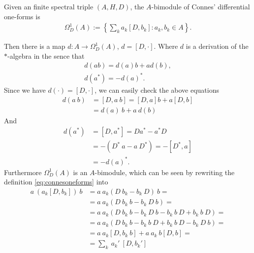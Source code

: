 \begin{definition}
    Given an finite spectral triple $(A, H, D)$, the $A$-bimodule of
    Connes' differential one-forms is
    \begin{align}\label{eq:connesoneforms}
        \Omega _D ^1 (A) := \left\{ \sum _k a_k[D, b_k]: a_k, b_k \in A
        \right\}.
    \end{align}
\end{definition}
Then there is a map $d:A\rightarrow \Omega _D ^1 (A)$, $d = [D, \cdot]$. Where
$d$ is a derivation of the $*$-algebra in the sence that
\begin{align}
    d(ab) = d(a)b + ad(b), \\
    d(a^*) = -d(a)^*.
\end{align}
Since we have $d(\cdot) = [D, \cdot]$, we can easily check the above equations
\begin{align}
    d(a\ b) &= [D, a\ b] = [D, a]b + a[D,b]\nonumber\\
    &= d(a)\ b + a\ d(b)
\end{align}
And
\begin{align}
    d(a^*) &= [D, a^*] = Da^* - a^*D \nonumber\\
    &=-(D^*\ a - a\ D^*) = -[D^*, a] \nonumber\\
    &= -d(a)^*.
\end{align}
Furthermore $\Omega _D^1 (A)$ is an $A$-bimodule, which can be seen by
rewriting the definition \eqref{eq:connesoneforms} into
\begin{align}
    a\ (a_k[D, b_k])\ b &= a\ a_k(D\ b_k - b_k\ D)\ b = \nonumber\\
       &= a\ a_k(D\ b_k\ b - b_k\ D\ b)=\nonumber\\
       &= a\ a_k(D\ b_k\ b - b_k\ D\ b - b_k\
       b\ D +b_k\ b\ D)=
       \nonumber\\
       &= a\ a_k(D\ b_k\ b-b_k\ b\ D + b_k\ b\ D - b_k\ D\ b) = \nonumber \\
       &= a\ a_k [D, b_k\ b] + a\ a_k\ b [D, b]=\nonumber\\
       &= \sum _k\ a_k'\ [D, b_k']
\end{align}

